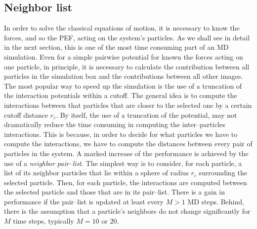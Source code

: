 \subsection{Neighbor list}
\label{sec:neighbor}
In order to solve the classical equations of motion, it is necessary to know the forces, and so the \ac{PEF}, acting on the system's particles. As we shall see in detail in the next section, this is one of the most time consuming part of an \ac{MD} simulation. Even for a simple pairwise potential for known the forces acting on one particle, in principle, it is necessary to calculate the contribution between all particles in the simulation box and the contributions between all other images. The most popular way to speed up the simulation is the use of a truncation of the interaction potentials within a cutoff. The general idea is to compute the interactions between that particles that are closer to the selected one by a certain cutoff distance $r_c$. By itself, the use of a truncation of the potential, may not dramatically reduce the time consuming in computing the inter--particles interactions. This is because, in order to decide for what particles we have to compute the interactions, we have to compute the distances between every pair of particles in the system. A marked increase of the performance is achieved by the use of a \textit{neighbor pair--list}. The simplest way is to consider, for each particle, a list of its neighbor particles that lie within a sphere of radius $r_c$ surrounding the selected particle. Then, for each particle, the interactions are computed between the selected particle and those that are in its pair--list. There is a gain in performance if the pair--list is updated at least every $M>1$ \ac{MD} steps. Behind, there is the assumption that a particle's neighbors do not change significantly for $M$ time steps, typically $M=10$ or $20$. 


